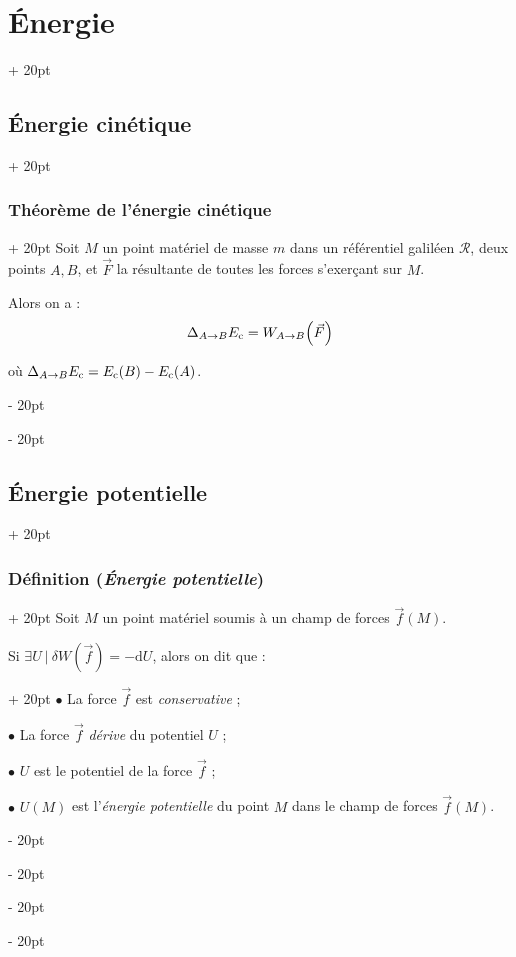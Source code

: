 \documentclass[a4paper, 12pt, twoside]{article}
\newcommand{\lr}[1]{\left( #1 \right)}
\newcommand{\ind}[1][20pt]{\advance\leftskip + #1}
\newcommand{\deind}[1][20pt]{\advance\leftskip - #1}
\newenvironment{indt}[2][20pt]{#2 \par \ind[#1]}{\par \deind} %
\begin{document}
\begin{indt}{\section{\'Energie}}
\begin{indt}{\subsection{Énergie cinétique}}
            \vspace{12pt}
            
            \begin{indt}{\subsubsection{Théorème de l'énergie cinétique}}
                Soit $M$ un point matériel de masse $m$ dans un référentiel galiléen $\mathscr R$, deux points $A, B$, et $\vec F$ la résultante de toutes les forces s'exerçant sur $M$.

                Alors on a :
                \[
                    \Delta_{A \to B} E_{\rm c} = W_{A \to B}\!\lr{\vec F}
                \]

                où $\Delta_{A \to B} E_{\rm c} = E_{\rm c}(B) - E_{\rm c}(A)$.
            \end{indt}
        \end{indt}

        \vspace{12pt}
        
        \begin{indt}{\subsection{Énergie potentielle}}
            \begin{indt}{\subsubsection{Définition (\textit{\'Energie potentielle})}}
                Soit $M$ un point matériel soumis à un champ de forces $\vec f(M)$.

                \begin{indt}{Si $\exists U\ |\ \delta W\!\!\lr{\vec f} = -\mathrm dU$, alors on dit que :}
                    $\bullet$ La force $\vec f$ est \textit{conservative} ;

                    $\bullet$ La force $\vec f$ \textit{dérive} du potentiel $U$ ;

                    $\bullet$ $U$ est le potentiel de la force $\vec f$ ;

                    $\bullet$ $U(M)$ est l'\textit{énergie potentielle} du point $M$ dans le champ de forces $\vec f(M)$.
                \end{indt}
            \end{indt}


\end{indt}
\end{indt}
\end{document}
